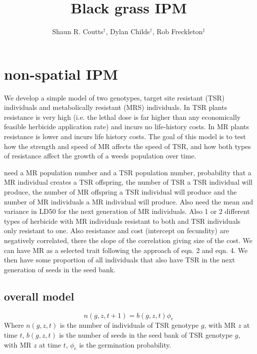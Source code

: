 \documentclass[12pt, a4paper]{article}
\begin{document}
\title{Black grass IPM}
\author{Shaun R. Coutts$^\dag$, Dylan Childs$^\dag$, Rob Freckleton$^\ddag$}
\maketitle
\section{non-spatial IPM}
We develop a simple model of two genotypes, target site resistant (TSR) individuals and metabolically resistant (MRS) individuals. In TSR plants resistance is very high (i.e. the lethal dose is far higher than any economically feasible herbicide application rate) and incurs no life-history costs. In MR plants resistance is lower and incurs life history costs. The goal of this model is to test how the strength and speed of MR affects the speed of TSR, and how both types of resistance affect the growth of a weeds population over time.

need a MR population number and a TSR population number, probability that a MR individual creates a TSR offspring, the number of TSR a TSR individual will produce, the number of MR offspring a TSR individual will produce and the number of MR individuals a MR individual will produce. Also need the mean and variance in LD50 for the next generation of MR individuals. Also 1 or 2 different types of herbicide with MR individuals resistant to both and TSR individuals only resistant to one. Also resistance and cost (intercept on fecundity) are negatively correlated, there the slope of the correlation giving size of the cost. We can have MR as a selected trait following the approach of \citep{Coul2010} eqn. 2 and eqn. 4. We then have some proportion of all individuals that also have TSR in the next generation of seeds in the seed bank.

\subsection{overall model}

\begin{equation}
	n(g, z, t + 1) = b(g, z, t)\phi_e
\end{equation} 
Where $n(g, z, t)$ is the number of individuals of TSR genotype $g$, with MR $z$ at time $t$, $b(g, z, t)$ is the number of seeds in the seed bank of TSR genotype $g$, with MR $z$ at time $t$, $\phi_e$ is the germination probability. 
\end{document}
